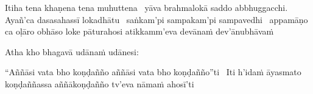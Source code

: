 \begin{pali-hang}
  Itiha tena khaṇena tena muhuttena \breathmark\ yāva brahmalokā saddo abbhuggacchi. Ayañ'ca dasasahassī lokadhātu \breathmark\ saṅkam'pi sampakam'pi sampavedhi \breathmark\ appamāṇo ca oḷāro obhāso loke pāturahosi atikkamm'eva devānaṁ dev'ānubhāvaṁ
\end{pali-hang}

Atha kho bhagavā udānaṁ udānesi:

\begin{pali-hang}
  ``Aññāsi vata bho koṇḍañño aññāsi vata bho koṇḍañño''ti \breathmark\ Iti h'idaṁ āyasmato koṇḍaññassa aññākoṇḍañño tv'eva nāmaṁ ahosī'ti
\end{pali-hang}

\suttaRef{[SN 56.11]}

